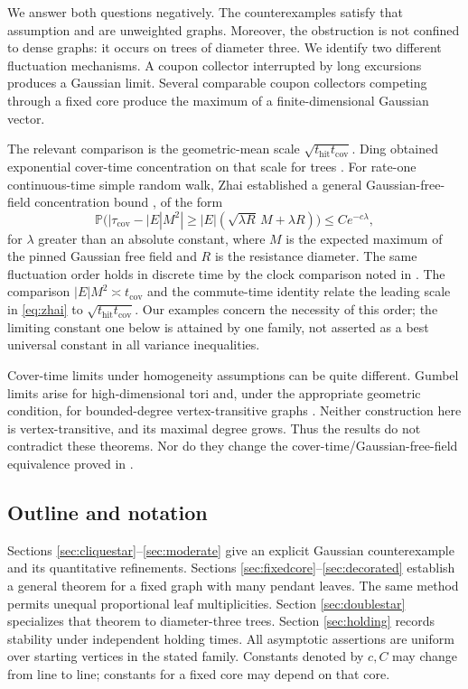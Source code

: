 \documentclass[11pt]{amsart}
\theoremstyle{remark}
\numberwithin{equation}{section}
\newcommand{\Prob}{\mathbb{P}}
\newcommand{\tcov}{t_{\mathrm{cov}}}
\newcommand{\thit}{t_{\mathrm{hit}}}
\newcommand{\taucov}{\tau_{\mathrm{cov}}}
\begin{document}
We answer both questions negatively. The counterexamples satisfy that assumption and are unweighted graphs. Moreover, the obstruction is not confined to dense graphs: it occurs on trees of diameter three. We identify two different fluctuation mechanisms. A coupon collector interrupted by long excursions produces a Gaussian limit. Several comparable coupon collectors competing through a fixed core produce the maximum of a finite-dimensional Gaussian vector.

The relevant comparison is the geometric-mean scale $\sqrt{\thit\tcov}$. Ding obtained exponential cover-time concentration on that scale for trees \cite{Ding14}. For rate-one continuous-time simple random walk, Zhai established a general Gaussian-free-field concentration bound \cite{Zhai18}, of the form
\begin{equation}\label{eq:zhai}
\Prob\big(|\taucov-|E|M^2|\ge |E|(\sqrt{\lambda R}\,M+\lambda R)\big)\le Ce^{-c\lambda},
\end{equation}
for $\lambda$ greater than an absolute constant, where $M$ is the expected maximum of the pinned Gaussian free field and $R$ is the resistance diameter. The same fluctuation order holds in discrete time by the clock comparison noted in \cite{Zhai18}. The comparison $|E|M^2\asymp\tcov$ and the commute-time identity relate the leading scale in \eqref{eq:zhai} to $\sqrt{\thit\tcov}$. Our examples concern the necessity of this order; the limiting constant one below is attained by one family, not asserted as a best universal constant in all variance inequalities.

Cover-time limits under homogeneity assumptions can be quite different. Gumbel limits arise for high-dimensional tori and, under the appropriate geometric condition, for bounded-degree vertex-transitive graphs \cite{Belius13,BHT22}. Neither construction here is vertex-transitive, and its maximal degree grows. Thus the results do not contradict these theorems. Nor do they change the cover-time/Gaussian-free-field equivalence proved in \cite{DLP12}.

\subsection{Outline and notation}
Sections \ref{sec:cliquestar}--\ref{sec:moderate} give an explicit Gaussian counterexample and its quantitative refinements. Sections \ref{sec:fixedcore}--\ref{sec:decorated} establish a general theorem for a fixed graph with many pendant leaves. The same method permits unequal proportional leaf multiplicities. Section \ref{sec:doublestar} specializes that theorem to diameter-three trees. Section \ref{sec:holding} records stability under independent holding times. All asymptotic assertions are uniform over starting vertices in the stated family. Constants denoted by $c,C$ may change from line to line; constants for a fixed core may depend on that core.
\end{document}
